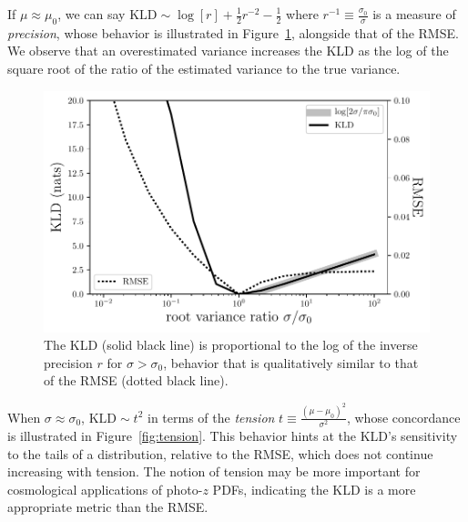 \documentclass[\docopts]{\docclass}
\newcommand{\pz}{photo-$z$ PDF}
\begin{document}
If $\mu\approx\mu_{0}$, we can say $\mathrm{KLD}\sim\log[r] + \frac{1}{2}r^{-2} 
- \frac{1}{2}$ where $r^{-1}\equiv\frac{\sigma_{0}}{\sigma}$ is a measure of 
\textit{precision}, whose behavior is illustrated in 
Figure~\ref{fig:precision}, alongside that of the RMSE.  We observe that an 
overestimated variance increases the KLD as the log of the square root of the 
ratio of the estimated variance to the true variance.

\begin{figure}
  \begin{center}
    \includegraphics[width=\columnwidth]{figures/precision.pdf}
    \caption{The KLD (solid black line) is proportional to the log of the 
inverse precision $r$ for $\sigma>\sigma_{0}$, behavior that is qualitatively 
similar to that of the RMSE (dotted black line).
    \label{fig:precision}}
  \end{center}
\end{figure}

When $\sigma\approx\sigma_{0}$, $\mathrm{KLD}\sim t^{2}$ in terms of the 
\textit{tension} $t\equiv\frac{(\mu-\mu_{0})^{2}}{\sigma^{2}}$, whose 
concordance is illustrated in Figure~\ref{fig:tension}.  This behavior hints at 
the KLD's sensitivity to the tails of a distribution, relative to the RMSE, 
which does not continue increasing with tension.  The notion of tension may be 
more important for cosmological applications of \pz s, indicating the KLD is a 
more appropriate metric than the RMSE.
\end{document}
